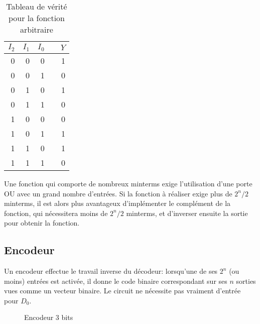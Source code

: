 \documentclass[11pt]{article}
\begin{document}
\begin{table}[htbp]
\caption{\label{tab:org3e22a34}Tableau de vérité pour la fonction arbitraire}
\centering
\begin{tabular}{rrrlr}
\(I_2\) & \(I_1\) & \(I_0\) &  & \(Y\)\\[0pt]
\hline
0 & 0 & 0 &  & 1\\[0pt]
0 & 0 & 1 &  & 0\\[0pt]
0 & 1 & 0 &  & 1\\[0pt]
0 & 1 & 1 &  & 0\\[0pt]
1 & 0 & 0 &  & 0\\[0pt]
1 & 0 & 1 &  & 1\\[0pt]
1 & 1 & 0 &  & 1\\[0pt]
1 & 1 & 1 &  & 0\\[0pt]
\end{tabular}
\end{table}

Une fonction qui comporte de nombreux minterms exige l'utilisation
d'une porte OU avec un grand nombre d'entrées. Si la fonction à
réaliser exige plus de \(2^n/2\) minterms, il est alors plus
avantageux d'implémenter le complément de la fonction, qui nécessitera
moins de \(2^n/2\) minterms, et d'inverser ensuite la sortie pour
obtenir la fonction.

\subsection{Encodeur}
\label{sec:org9dd665c}

Un encodeur effectue le travail inverse du décodeur: lorsqu'une de ses
\(2^n\) (ou moins) entrées est activée, il donne le code binaire
correspondant sur ses \(n\) sorties vues comme un vecteur binaire. Le
circuit ne nécessite pas vraiment d'entrée pour \(D_0\).


\begin{figure}[htbp]
\centering

\caption{\label{fig:org2a7fd21}Encodeur 3 bits}
\end{figure}
\end{document}
